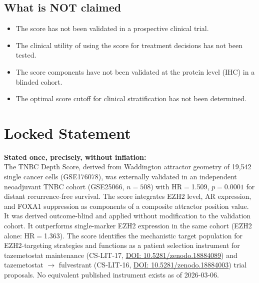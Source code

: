 \documentclass[12pt, a4paper]{article}
\begin{document}
\subsection{What is NOT claimed}

\begin{itemize}
    \item The score has not been validated in a
    prospective clinical trial.
    \item The clinical utility of using the score
    for treatment decisions has not been tested.
    \item The score components have not been
    validated at the protein level (IHC) in a
    blinded cohort.
    \item The optimal score cutoff for clinical
    stratification has not been determined.
\end{itemize}

\section{Locked Statement}

\begin{center}
\colorbox{findingbox}{
\begin{minipage}{0.88\textwidth}
\vspace{0.6em}
\textbf{Stated once, precisely, without inflation:}
\\[0.5em]
The TNBC Depth Score, derived from Waddington
attractor geometry of 19,542 single cancer cells
(GSE176078), was externally validated in an
independent neoadjuvant TNBC cohort (GSE25066,
$n=508$) with HR$=$1.509, $p=0.0001$ for distant
recurrence-free survival. The score integrates
EZH2 level, AR expression, and FOXA1 suppression
as components of a composite attractor position
value. It was derived outcome-blind and applied
without modification to the validation cohort.
It outperforms single-marker EZH2 expression
in the same cohort (EZH2 alone: HR$=$1.363).
The score identifies the mechanistic target
population for EZH2-targeting strategies and
functions as a patient selection instrument
for tazemetostat maintenance (CS-LIT-17,
\href{https://doi.org/10.5281/zenodo.18884089}
{DOI: 10.5281/zenodo.18884089}) and tazemetostat
$\rightarrow$ fulvestrant (CS-LIT-16,
\href{https://doi.org/10.5281/zenodo.18884003}
{DOI: 10.5281/zenodo.18884003}) trial proposals.
No equivalent published instrument exists as of
2026-03-06.
\vspace{0.5em}
\end{minipage}}
\end{center}
\end{document}
